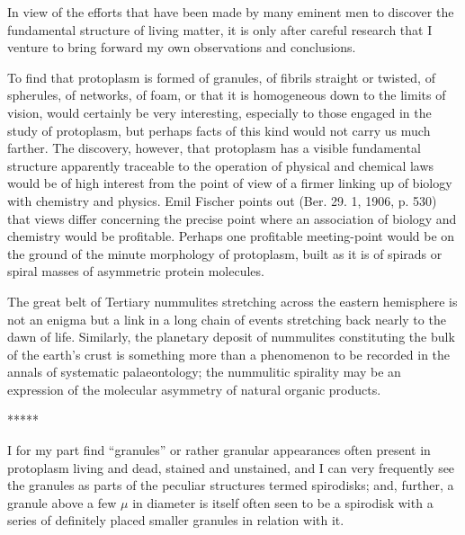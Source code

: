 \documentclass[a4paper, 12pt, oneside]{article}
\begin{document}
In view of the efforts that have been made by many eminent men to discover the fundamental structure of living matter, it is only after careful research that I venture to bring forward my own observations and conclusions.

To find that protoplasm is formed of granules, of fibrils straight or twisted, of spherules, of networks, of foam, or that it is homogeneous down to the limits of vision, would certainly be very interesting, especially to those engaged in the study of protoplasm, but perhaps facts of this kind would not carry us much farther. The discovery, however, that protoplasm has a visible fundamental structure apparently traceable to the operation of physical and chemical laws would be of high interest from the point of view of a firmer linking up of biology with chemistry and physics. Emil Fischer points out (Ber. 29. 1, 1906, p. 530) that views differ concerning the precise point where an association of biology and chemistry would be profitable. Perhaps one profitable meeting-point would be on the ground of the minute morphology of protoplasm, built as it is of spirads or spiral masses of asymmetric protein molecules.

The great belt of Tertiary nummulites stretching across the eastern hemisphere is not an enigma but a link in a long chain of events stretching back nearly to the dawn of life. Similarly, the planetary deposit of nummulites constituting the bulk of the earth's crust is something more than a phenomenon to be recorded in the annals of systematic palaeontology; the nummulitic spirality may be an expression of the molecular asymmetry of natural organic products.

\centerline{*\hspace{15mm}*\hspace{15mm}*\hspace{15mm}*\hspace{15mm}*}
\bigskip

I for my part find ``granules'' or rather granular appearances often present in protoplasm living and dead, stained and unstained, and I can very frequently see the granules as parts of the peculiar structures termed spirodisks; and, further, a granule above a few $\mu$ in diameter is itself often seen to be a spirodisk with a series of definitely placed smaller granules in relation with it.
\end{document}

